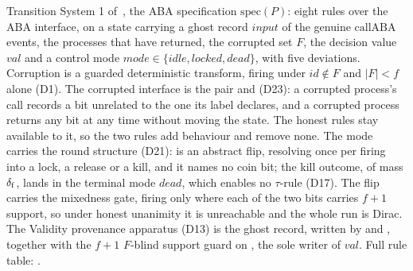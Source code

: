 \begin{definition}
  \label{def:aba-spec}
  \leanok
  Transition System 1 of~\cite{LeslieBP}, the ABA specification $\mathrm{spec}(P)$: eight rules over the ABA interface, on a state carrying a ghost record $input$ of the genuine $\mathrm{callABA}$ events, the processes that have returned, the corrupted set $F$, the decision value $val$ and a control mode $mode \in \{idle, locked, dead\}$, with five deviations.
  Corruption is a guarded deterministic transform,  firing under $id \notin F$ and $|F| < f$ alone (D1).
  The corrupted interface is the pair  and  (D23): a corrupted process's call records a bit unrelated to the one its label declares, and a corrupted process returns any bit at any time without moving the state.
  The honest rules stay available to it, so the two rules add behaviour and remove none.
  The mode carries the round structure (D21):  is an abstract flip, resolving once per firing into a lock, a release or a kill, and it names no coin bit; the kill outcome, of mass $\delta_{\mathrm{f}}$, lands in the terminal mode $dead$, which enables no $\tau$-rule (D17).
  The flip carries the mixedness gate, firing only where each of the two bits carries $f{+}1$ support, so under honest unanimity it is unreachable and the whole run is Dirac.
  The Validity provenance apparatus (D13) is the ghost record, written by  and , together with the $f{+}1$ $F$-blind support guard  on , the sole writer of $val$.
  Full rule table: .
\end{definition}
